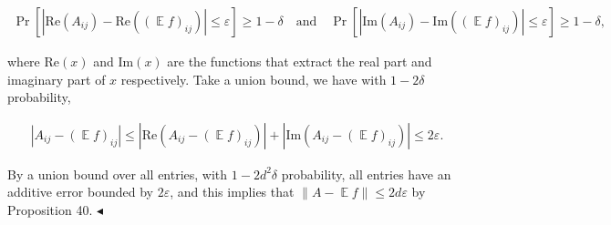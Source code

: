 \documentclass[10pt,a4paper]{article}
\begin{document}
\[\begin{gathered}
\Pr\left[\left|\mathrm{Re}(A_{ij})-\mathrm{Re}((\operatorname*{\mathbb{E}}f)_{ij})\right|\leq\varepsilon\right]\geq 1-\delta\quad\text{and}\quad\Pr\left[\left|\mathrm{Im}(A_{ij})-\mathrm{Im}((\operatorname*{\mathbb{E}}f)_{ij})\right|\leq\varepsilon\right]\geq 1-\delta,
\end{gathered}\]


where $\mathrm{Re}(x)$ and $\mathrm{Im}(x)$ are the functions that extract the real part and imaginary part of $x$ respectively. Take a union bound, we have with $1-2\delta$ probability,\par


\[\begin{gathered}
\left|A_{ij}-(\operatorname*{\mathbb{E}}f)_{ij}\right|\leq\left|\mathrm{Re}(A_{ij}-(\operatorname*{\mathbb{E}}f)_{ij})\right|+\left|\mathrm{Im}(A_{ij}-(\operatorname*{\mathbb{E}}f)_{ij})\right|\leq 2\varepsilon.
\end{gathered}\]


By a union bound over all entries, with $1-2d^{2}\delta$ probability, all entries have an additive error bounded by $2\varepsilon$, and this implies that $\|A-\operatorname*{\mathbb{E}}f\|\leq 2d\varepsilon$ by Proposition 40.
$\blacktriangleleft$
\par
\end{document}
